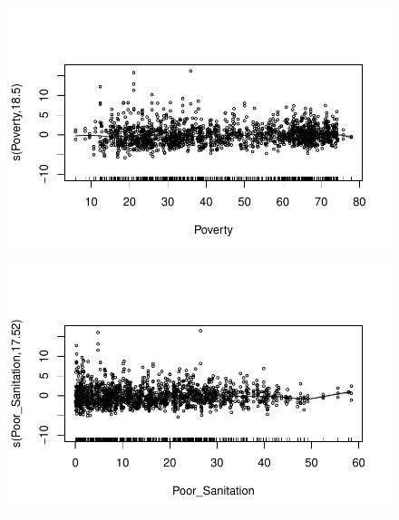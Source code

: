 \documentclass[
  letterpaper,
  DIV=11,
  numbers=noendperiod]{scrartcl}
\begin{document}
\begin{figure}[H]

{\centering \includegraphics{Group34Coursework_files/figure-pdf/unnamed-chunk-9-5.pdf}

}

\end{figure}

\begin{figure}[H]

{\centering \includegraphics{Group34Coursework_files/figure-pdf/unnamed-chunk-9-6.pdf}

}

\end{figure}
\end{document}
